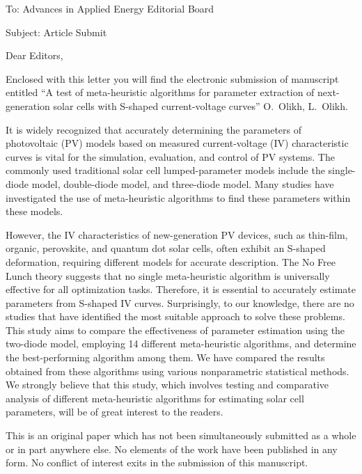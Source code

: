 \documentclass[preprint]{elsarticle}
\begin{document}
To:
Advances in Applied Energy Editorial Board


Subject:
Article Submit

\vspace{5mm}
Dear Editors,

\vspace{3mm}
Enclosed with this letter you will find the electronic submission of manuscript entitled
``A test of meta-heuristic algorithms for parameter extraction of next-generation solar cells with S-shaped current-voltage curves'' O.~Olikh, L.~Olikh.



It is widely recognized that accurately determining the parameters of photovoltaic (PV) models
based on measured current-voltage (IV) characteristic curves is vital for the simulation, evaluation, and control of PV systems.
The commonly used traditional solar cell lumped-parameter models include the single-diode model, double-diode model, and three-diode model.
Many studies have investigated the use of meta-heuristic algorithms to find these parameters within these models.

However, the IV characteristics of new-generation PV devices, such as thin-film, organic, perovskite, and quantum dot solar cells, often exhibit an S-shaped deformation, requiring different models for accurate description.
The No Free Lunch theory suggests that no single meta-heuristic algorithm is universally effective for all optimization tasks.
Therefore, it is essential to accurately estimate parameters from S-shaped IV curves.
Surprisingly, to our knowledge, there are no studies that have identified the most suitable approach to solve these problems.
This study aims to compare the effectiveness of parameter estimation using the two-diode model, employing 14 different meta-heuristic algorithms, and determine the best-performing algorithm among them.
We have compared the results obtained from these algorithms using various nonparametric statistical methods.
We strongly believe that this study, which involves testing and comparative analysis of different meta-heuristic algorithms for estimating solar cell parameters, will be of great interest to the readers.


This is an original paper which has not been simultaneously submitted as a whole or in part anywhere else.
No elements of the work have been published in any form.
No conflict of interest exits in the submission of this manuscript.
\end{document}
